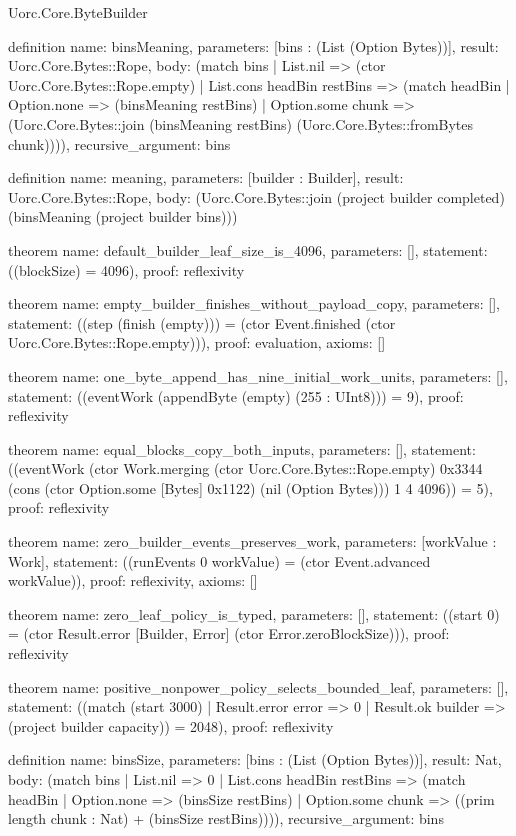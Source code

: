 \begin{lexlean}{Uorc.Core.ByteBuilder}
\begin{semanticmodule}
definition{
  name: binsMeaning,
  parameters: [bins : (List (Option Bytes))],
  result: Uorc.Core.Bytes::Rope,
  body: (match bins
    | List.nil => (ctor Uorc.Core.Bytes::Rope.empty)
    | List.cons headBin restBins => (match headBin
      | Option.none => (binsMeaning restBins)
      | Option.some chunk => (Uorc.Core.Bytes::join (binsMeaning restBins) (Uorc.Core.Bytes::fromBytes chunk)))),
  recursive_argument: bins
}

definition{
  name: meaning,
  parameters: [builder : Builder],
  result: Uorc.Core.Bytes::Rope,
  body: (Uorc.Core.Bytes::join (project builder completed) (binsMeaning (project builder bins)))
}

theorem{
  name: default_builder_leaf_size_is_4096,
  parameters: [],
  statement: ((blockSize) = 4096),
  proof: reflexivity{}
}

theorem{
  name: empty_builder_finishes_without_payload_copy,
  parameters: [],
  statement: ((step (finish (empty))) = (ctor Event.finished (ctor Uorc.Core.Bytes::Rope.empty))),
  proof: evaluation{},
  axioms: []
}

theorem{
  name: one_byte_append_has_nine_initial_work_units,
  parameters: [],
  statement: ((eventWork (appendByte (empty) (255 : UInt8))) = 9),
  proof: reflexivity{}
}

theorem{
  name: equal_blocks_copy_both_inputs,
  parameters: [],
  statement: ((eventWork (ctor Work.merging (ctor Uorc.Core.Bytes::Rope.empty) 0x3344 (cons (ctor Option.some [Bytes] 0x1122) (nil (Option Bytes))) 1 4 4096)) = 5),
  proof: reflexivity{}
}

theorem{
  name: zero_builder_events_preserves_work,
  parameters: [workValue : Work],
  statement: ((runEvents 0 workValue) = (ctor Event.advanced workValue)),
  proof: reflexivity{},
  axioms: []
}

theorem{
  name: zero_leaf_policy_is_typed,
  parameters: [],
  statement: ((start 0) = (ctor Result.error [Builder, Error] (ctor Error.zeroBlockSize))),
  proof: reflexivity{}
}

theorem{
  name: positive_nonpower_policy_selects_bounded_leaf,
  parameters: [],
  statement: ((match (start 3000)
    | Result.error error => 0
    | Result.ok builder => (project builder capacity)) = 2048),
  proof: reflexivity{}
}

definition{
  name: binsSize,
  parameters: [bins : (List (Option Bytes))],
  result: Nat,
  body: (match bins
    | List.nil => 0
    | List.cons headBin restBins => (match headBin
      | Option.none => (binsSize restBins)
      | Option.some chunk => ((prim length chunk : Nat) + (binsSize restBins)))),
  recursive_argument: bins
}


\end{semanticmodule}
\end{lexlean}
